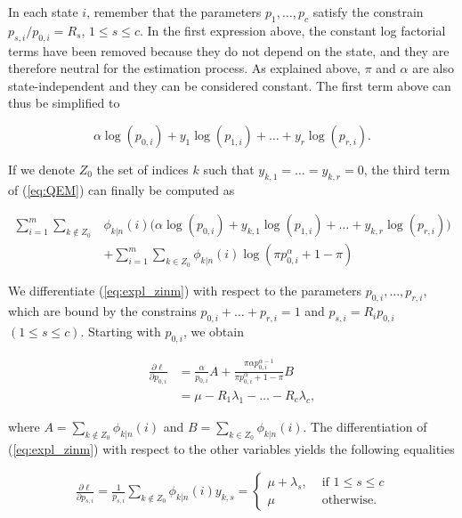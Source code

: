 \documentclass[12pt]{article}
\begin{document}
\begin{appendices}
    In each state $i$, remember that the parameters
    $p_1, \ldots, p_c$ satisfy the constrain $p_{s,i}/p_{0,i}=R_s$,
    $1 \leq s \leq c$.  In the first expression above,
    the constant log factorial terms
    have been removed because they do not depend on the state,
    and they are therefore neutral for the
    estimation process. As explained above, $\pi$ and
    $\alpha$ are also state-independent and they can be considered
    constant. The first term above can thus be simplified to

    \begin{equation*}
      \alpha\log(p_{0,i}) + y_1\log(p_{1,i}) + \ldots
      + y_r\log(p_{r,i}).
    \end{equation*}

    If we denote  $Z_0$ the set of indices $k$ such that
    $y_{k,1} = \ldots = y_{k,r} = 0$, the third term of
    (\ref{eq:QEM}) can finally be computed as

    \begin{align}
      \sum_{i=1}^m\sum_{k \notin Z_0} &\phi_{k|n}(i)
      \Big(\alpha\log(p_{0,i}) + y_{k,1}\log(p_{1,i}) + 
      \ldots + y_{k,r}\log(p_{r,i}) \Big) \nonumber \\
       &+ \sum_{i=1}^m\sum_{k \in Z_0} \phi_{k|n}(i)
      \log(\pi p_{0,i}^{\alpha} + 1-\pi)
\label{eq:expl_zinm}
    \end{align}

    We differentiate (\ref{eq:expl_zinm}) with respect to the parameters
    $p_{0,i}, \ldots, p_{r,i}$, which are bound by the constrains
    $p_{0,i} + \ldots + p_{r,i} = 1$ and $p_{s,i}=R_i p_{0,i}$
    $(1 \leq s \leq c)$. Starting with $p_{0,i}$, we obtain

    \begin{align}
      \frac{\partial \ell}{\partial p_{0,i}} &=
      \frac{\alpha}{p_{0,i}} A
      + \frac{\pi\alpha p_{0,i}^{\alpha-1}} {\pi p_{0,i}^{\alpha} +
      1-\pi} B \nonumber \\
      &= \mu - R_1 \lambda_1 - \ldots -R_c \lambda_c,
\label{eq:p0}
    \end{align}

    \noindent
    where $A = \sum_{k \notin Z_0} \phi_{k|n}(i)$ and
    $B =  \sum_{k \in Z_0} \phi_{k|n}(i)$. 
    The differentiation of (\ref{eq:expl_zinm}) with respect to the
    other variables yields the following equalities

    \begin{align}
      \frac{\partial \ell}{\partial p_{s,i}} = 
      \frac{1}{p_{s,i}} \sum_{k \notin Z_0} \phi_{k|n}(i) y_{k,s}
      = \left\{
      \begin{array}{ll}
      \mu + \lambda_s, &\mbox{ if } 1 \leq s \leq c \\
      \mu &\mbox{ otherwise.}
      \end{array}
      \right.
\label{eq:p1}
    \end{align}


\end{appendices}
\end{document}
